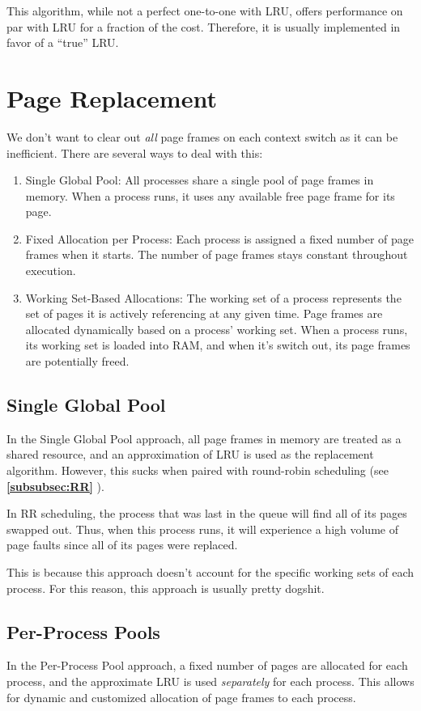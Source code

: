 \documentclass{report}
\newcommand{\exampleBegin}[1]{\begin{tcolorbox}[colback=blue!5!white,colframe=black!75!blue,title={Example:
      #1}]}
\newcommand{\exampleEnd}{\end{tcolorbox}}
\newcommand{\refto}[2]{\textbf{\ref{#1:#2} \nameref{#1:#2}}}
\begin{document}
This algorithm, while not a perfect one-to-one with LRU, offers performance on par with LRU for a
fraction of the cost. Therefore, it is usually implemented in favor of a ``true'' LRU.


\section{Page Replacement}
We don't want to clear out \textit{all} page frames on each context switch as it can be
inefficient. There are several ways to deal with this:

\begin{enumerate}[label=\textit{(\roman*)}]
\item Single Global Pool: All processes share a single pool of page frames in memory. When a process
  runs, it uses any available free page frame for its page.
\item Fixed Allocation per Process: Each process is assigned a fixed number of page frames when it
  starts. The number of page frames stays constant throughout execution.
\item Working Set-Based Allocations: The working set of a process represents the set of pages it is
  actively referencing at any given time. Page frames are allocated dynamically based on a process'
  working set. When a process runs, its working set is loaded into RAM, and when it's switch out,
  its page frames are potentially freed.
\end{enumerate}


\subsection{Single Global Pool}
In the Single Global Pool approach, all page frames in memory are treated as a shared resource, and
an approximation of LRU is used as the replacement algorithm. However, this sucks when paired with
round-robin scheduling (see \refto{subsubsec}{RR}).

\exampleBegin{Fair or Unfair}
In RR scheduling, the process that was last in the queue will find all of its pages swapped
out. Thus, when this process runs, it will experience a high volume of page faults since all of its
pages were replaced.
\exampleEnd

This is because this approach doesn't account for the specific working sets of each process. For
this reason, this approach is usually pretty dogshit.


\subsection{Per-Process Pools}
In the Per-Process Pool approach, a fixed number of pages are allocated for each process, and the
approximate LRU is used \textit{separately} for each process. This allows for dynamic and customized
allocation of page frames to each process.
\end{document}
